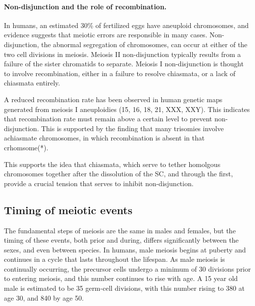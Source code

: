 \paragraph{Non-disjunction and the role of recombination.}
In humans, an estimated 30\% of fertilized eggs have aneuploid chromosomes\cite{Hassold2001}, and evidence suggests that meiotic errors are responsible in many cases.
Non-disjunction, the abnormal segregation of chromosomes, can occur at either of the two cell divisions in meiosis.
Meiosis II non-disjunction typically results from a failure of the sister chromatids to separate.
Meiosis I non-disjunction is thought to involve recombination, either in a failure to resolve chiasmata, or a lack of chiasmata entirely.

A reduced recombination rate has been observed in human genetic maps generated from meiosis I aneuploidies (15, 16, 18, 21, XXX, XXY)\cite{Hassold2001,Lynn2004}.
This indicates that recombination rate must remain above a certain level to prevent non-disjunction.
This is supported by the finding that many trisomies involve achiasmate chromosomes, in which recombination is absent in that crhomsome(*).

This supports the idea that chiasmata, which serve to tether homolgous chromosomes together after the dissolution of the SC, and through the first, provide a crucial tension that serves to inhibit non-disjunction.




\subsection{Timing of meiotic events}

The fundamental steps of meiosis are the same in males and females, but the timing of these events, both prior and during, differs significantly between the sexes\cite{Lynn2004}, and even between species.
In humans, male meiosis begins at puberty and continues in a cycle that lasts throughout the lifespan.
As male meiosis is continually occurring, the precursor cells undergo a minimum of 30 divisions prior to entering meiosis, and this number continues to rise with age.
A 15 year old male is estimated to be 35 germ-cell divisions, with this number rising to 380 at age 30, and 840 by age 50\cite{Crow2000a}.

